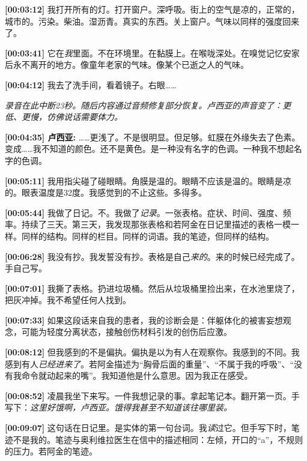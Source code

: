 \noindent \textbf{[00:03:12]} 我打开所有的灯。打开窗户。深呼吸。街上的空气是凉的，正常的，城市的。污染。柴油。湿沥青。真实的东西。关上窗户。气味以同样的强度回来了。

\noindent \textbf{[00:03:41]} 它在\textit{我}里面。不在环境里。在黏膜上。在喉咙深处。在嗅觉记忆安家后永不离开的地方。像童年老家的气味。像某个已逝之人的气味。

\noindent \textbf{[00:04:12]} 我去了洗手间，看着镜子。右眼……

\noindent \textit{录音在此中断23秒。随后内容通过音频修复部分恢复。卢西亚的声音变了：更低、更慢，仿佛说话需要体力。}

\noindent \textbf{[00:04:35] 卢西亚:} ……更浅了。不是很明显。但足够。虹膜在外缘失去了色素。变成……我不知道的颜色。还不是黄色。是一种没有名字的色调。一种我不想起名字的色调。

\noindent \textbf{[00:05:11]} 我用指尖碰了碰眼睛。角膜是温的。眼睛不应该是温的。眼睛是凉的。眼表温度是32度。我感觉到的不止这些。多得多。

\noindent \textbf{[00:05:44]} 我做了日记。不。我做了\textit{记录}。一张表格。症状、时间、强度、频率。持续了三天。第三天，我发现那张表格和若阿金在日记里描述的表格一模一样。同样的结构。同样的栏目。同样的词语。我的笔迹，但同样的结构。

\noindent \textbf{[00:06:28]} 我没有抄。我发誓没有抄。表格是自己\textit{来的}。来的时候已经完成了。手自己写。

\noindent \textbf{[00:07:01]} 我撕了表格。扔进垃圾桶。然后从垃圾桶里捡出来，在水池里烧了，把灰冲掉。我不希望任何人找到。

\noindent \textbf{[00:07:33]} 如果这段话来自我的患者，我的诊断会是：伴躯体化的被害妄想观念，可能为轻度分离状态，接触创伤材料引发的创伤后应激。

\noindent \textbf{[00:08:12]} 但我感到的不是偏执。偏执是以为有人在观察你。我感到的不同。我感到有人\textit{已经进来了}。若阿金描述为\textquotedblleft{}胸骨后面的重量\textquotedblright{}、\textquotedblleft{}不属于我的呼吸\textquotedblright{}、\textquotedblleft{}没有我命令就动起来的嘴\textquotedblright{}。我知道他是什么意思。因为我正在感受。

\noindent \textbf{[00:08:52]} 凌晨我坐下来写。一件我想记录的事。拿起笔记本。翻开第一页。手写下：\textit{这里好饿啊，卢西亚。饿得我甚至不知道该往哪里装。}

\noindent \textbf{[00:09:07]} 这句话在日记里。是实体的第一句台词。我\textit{读}过它。但手写下时，笔迹不是我的。笔迹与奥利维拉医生在信中的描述相同：左倾，开口的\textquotedblleft{}a\textquotedblright{}，不规则的压力。若阿金的笔迹。

